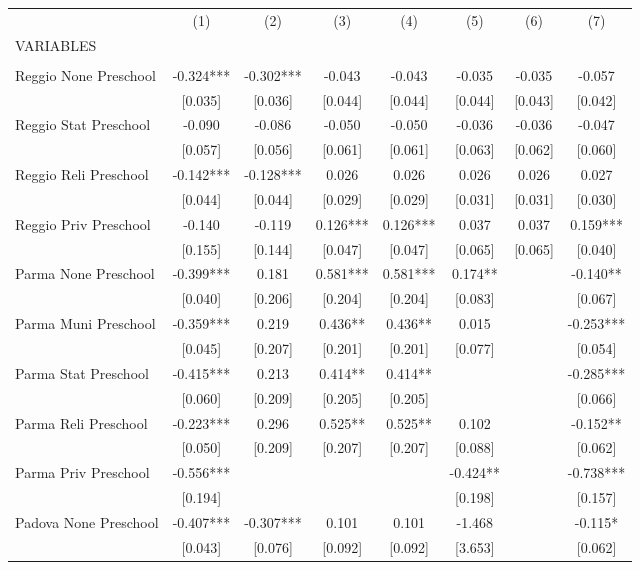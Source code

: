 \begin{tabular}{lccccccc} \hline
 & (1) & (2) & (3) & (4) & (5) & (6) & (7) \\
VARIABLES &  &  &  &  &  &  &  \\ \hline
 &  &  &  &  &  &  &  \\
Reggio None Preschool & -0.324*** & -0.302*** & -0.043 & -0.043 & -0.035 & -0.035 & -0.057 \\
 & [0.035] & [0.036] & [0.044] & [0.044] & [0.044] & [0.043] & [0.042] \\
Reggio Stat Preschool & -0.090 & -0.086 & -0.050 & -0.050 & -0.036 & -0.036 & -0.047 \\
 & [0.057] & [0.056] & [0.061] & [0.061] & [0.063] & [0.062] & [0.060] \\
Reggio Reli Preschool & -0.142*** & -0.128*** & 0.026 & 0.026 & 0.026 & 0.026 & 0.027 \\
 & [0.044] & [0.044] & [0.029] & [0.029] & [0.031] & [0.031] & [0.030] \\
Reggio Priv Preschool & -0.140 & -0.119 & 0.126*** & 0.126*** & 0.037 & 0.037 & 0.159*** \\
 & [0.155] & [0.144] & [0.047] & [0.047] & [0.065] & [0.065] & [0.040] \\
Parma None Preschool & -0.399*** & 0.181 & 0.581*** & 0.581*** & 0.174** &  & -0.140** \\
 & [0.040] & [0.206] & [0.204] & [0.204] & [0.083] &  & [0.067] \\
Parma Muni Preschool & -0.359*** & 0.219 & 0.436** & 0.436** & 0.015 &  & -0.253*** \\
 & [0.045] & [0.207] & [0.201] & [0.201] & [0.077] &  & [0.054] \\
Parma Stat Preschool & -0.415*** & 0.213 & 0.414** & 0.414** &  &  & -0.285*** \\
 & [0.060] & [0.209] & [0.205] & [0.205] &  &  & [0.066] \\
Parma Reli Preschool & -0.223*** & 0.296 & 0.525** & 0.525** & 0.102 &  & -0.152** \\
 & [0.050] & [0.209] & [0.207] & [0.207] & [0.088] &  & [0.062] \\
Parma Priv Preschool & -0.556*** &  &  &  & -0.424** &  & -0.738*** \\
 & [0.194] &  &  &  & [0.198] &  & [0.157] \\
Padova None Preschool & -0.407*** & -0.307*** & 0.101 & 0.101 & -1.468 &  & -0.115* \\
 & [0.043] & [0.076] & [0.092] & [0.092] & [3.653] &  & [0.062] \\

\end{tabular}
